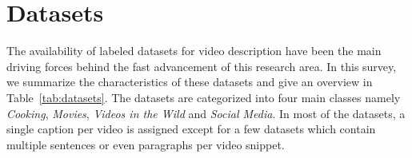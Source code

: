 \documentclass[10pt,journal,compsoc]{IEEEtran}
\begin{document}
\section{Datasets}
\label{ch:datasetssection}
The availability of labeled datasets for video description have been the main driving forces behind the fast advancement of this research area. In this survey, we summarize the characteristics of these datasets and give an overview in Table~\ref{tab:datasets}. The datasets are categorized into four main classes namely \textit{Cooking}, \textit{Movies}, \textit{Videos in the Wild} and \textit{Social Media}. In most of the datasets, a single caption per video is assigned except for a few datasets which contain multiple sentences or even paragraphs per video snippet.
\end{document}
